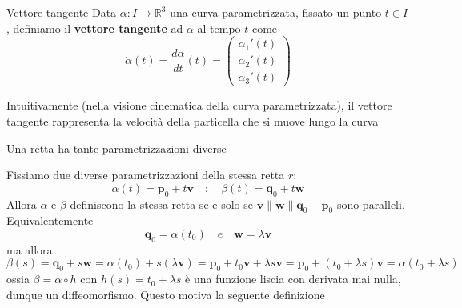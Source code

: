 \begin{definition}{Vettore tangente}
    Data \(\alpha: I \to \mathbb{R}^3\) una curva parametrizzata, fissato un
    punto \(t \in I\), definiamo il \textbf{vettore tangente} ad \(\alpha\) al
    tempo \(t\) come
    \[
      \dot{\alpha}{(t)} = \frac{d \alpha}{dt} {(t)} = \begin{pmatrix}
          \alpha_{1}'{(t)} \\ \alpha_{2}'{(t)} \\ \alpha_{3}'{(t)}
      \end{pmatrix}
    \]
\end{definition}
\begin{remark}
    Intuitivamente (nella visione cinematica della curva parametrizzata), il
    vettore tangente rappresenta la velocità della particella che si muove lungo
    la curva 
\end{remark}
\begin{remark}
    Una retta ha tante parametrizzazioni diverse 
\end{remark}
Fissiamo due diverse parametrizzazioni della stessa retta \(r\):
\begin{equation*}
    \alpha{(t)} = \mathbf{p}_0 + t\mathbf{v} \quad ; \quad \beta{(t)} =
    \mathbf{q}_0 + t\mathbf{w}
\end{equation*}
Allora \(\alpha\) e \(\beta\) definiscono la stessa retta se e solo se \(\mathbf{v} 
\parallel \mathbf{w} \parallel \mathbf{q}_0 - \mathbf{p}_0\) sono paralleli.
Equivalentemente
\[
  \mathbf{q}_0 = \alpha{(t_{0})} \quad e \quad \mathbf{w}  = \lambda \mathbf{v} 
\]
ma allora
\[
  \beta{(s)} = \mathbf{q}_0 + s\mathbf{w}  = \alpha{(t_{0})} +
  s{(\lambda\mathbf{v} )} = \mathbf{p}_0 + t_{0}\mathbf{v} +\lambda s \mathbf{v}
  = \mathbf{p}_0 + {(t_{0}+\lambda s)} \mathbf{v}  = \alpha{(t_{0} + \lambda s)} 
\]
ossia \(\beta = \alpha\circ h\) con \(h{(s)} = t_{0}+\lambda s\) è una funzione
liscia con derivata mai nulla, dunque un diffeomorfismo. Questo motiva la
seguente definizione

